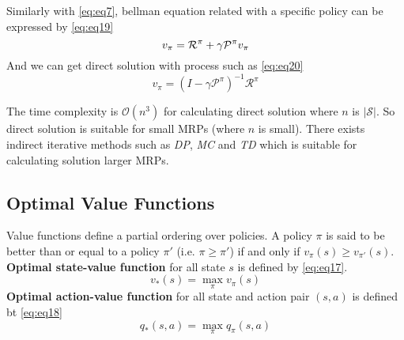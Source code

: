 \documentclass[
	10pt, %
]{article}
\newcommand{\mbb}[1]{\mathbb{#1}}
\newcommand{\mc}[1]{\mathcal{#1}}
\newcommand{\tb}[1]{\textbf{#1}}
\newcommand{\ti}[1]{\textit{#1}}
\numberwithin{equation}{subsection} %
\begin{document}
Similarly with \cref{eq:eq7}, bellman equation related with a specific policy can be expressed by \cref{eq:eq19}
\begin{equation} \label{eq:eq19}
    v_\pi = \mc{R}^\pi + \gamma \mc{P}^\pi v_\pi\\
\end{equation}
And we can get direct solution with process such as \cref{eq:eq20}
\begin{equation} \label{eq:eq20}
    v_\pi = (I - \gamma \mc{P}^\pi)^{-1} \mc{R}^\pi
\end{equation}

The time complexity is $\mc{O}(n^3)$ for calculating direct solution where $n$ is $|\mc{S}|$.
So direct solution is suitable for small MRPs (where $n$ is small).
There exists indirect iterative methods such as \ti{DP}, \ti{MC} and \ti{TD} which is suitable for calculating solution larger MRPs.

\subsection{Optimal Value Functions}
Value functions define a partial ordering over policies. A policy $\pi$ is said to be better than or equal to a policy $\pi'$ (i.e. $\pi \geq \pi'$) if and only if $v_\pi(s) \geq v_{\pi'}(s)$.
\tb{Optimal state-value function} for all state $s$ is defined by \cref{eq:eq17}.
\begin{equation} \label{eq:eq17}
    v_*(s) = \max_{\pi} v_\pi(s)
\end{equation}
\tb{Optimal action-value function} for all state and action pair $(s, a)$ is defined bt \cref{eq:eq18}
\begin{equation} \label{eq:eq18}
    q_*(s,a) = \max_\pi q_\pi(s,a)
\end{equation}
\end{document}
